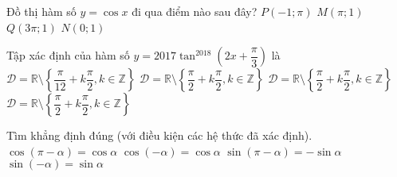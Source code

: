 \begin{ex}%
        Đồ thị hàm số $y=\cos x$ đi qua điểm nào sau đây?
        \choice
        {$P(-1;\pi)$}
        {$M(\pi;1)$}
        {$Q(3\pi; 1)$}
        {\True $N(0;1)$}
    \end{ex}

\begin{ex}%
        Tập xác định của hàm số $y=2017\tan^{2018} \left( 2x+\dfrac{\pi}{3}\right)$ là
        \choice
        {\True $\mathscr{D}=\mathbb{R}\setminus\left\lbrace\dfrac{\pi}{12}+k\dfrac{\pi}{2}, k\in\mathbb{Z} \right\rbrace $}
        {$\mathscr{D}=\mathbb{R}\setminus\left\lbrace\dfrac{\pi}{2}+k\dfrac{\pi}{2}, k\in\mathbb{Z} \right\rbrace $}
        {$\mathscr{D}=\mathbb{R}\setminus\left\lbrace\dfrac{\pi}{2}+k\dfrac{\pi}{2}, k\in\mathbb{Z} \right\rbrace $}
        {$\mathscr{D}=\mathbb{R}\setminus\left\lbrace\dfrac{\pi}{2}+k\dfrac{\pi}{2}, k\in\mathbb{Z} \right\rbrace $}
        \end{ex}

\begin{ex}%
        Tìm khẳng định đúng (với điều kiện các hệ thức đã xác định).
        \choice
        {$\cos \left(\pi -\alpha \right)=\cos \alpha$}
        {\True $\cos \left(-\alpha \right)=\cos \alpha$}
        {$\sin \left(\pi -\alpha \right)=-\sin \alpha$}
        {$\sin \left(-\alpha \right)=\sin \alpha$}
    \end{ex}



